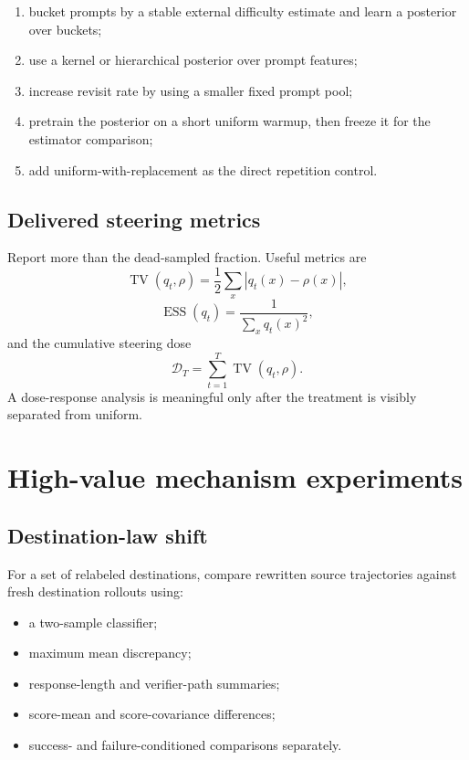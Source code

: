 \documentclass[11pt]{article}
\newcommand{\TV}{\operatorname{TV}}
\theoremstyle{definition}
\theoremstyle{remark}
\begin{document}
\begin{enumerate}[leftmargin=2em]
\item bucket prompts by a stable external difficulty estimate and learn a posterior over buckets;
\item use a kernel or hierarchical posterior over prompt features;
\item increase revisit rate by using a smaller fixed prompt pool;
\item pretrain the posterior on a short uniform warmup, then freeze it for the estimator comparison;
\item add uniform-with-replacement as the direct repetition control.
\end{enumerate}

\subsection{Delivered steering metrics}

Report more than the dead-sampled fraction. Useful metrics are
\begin{equation}
\TV(q_t,\rho)=\frac12\sum_x|q_t(x)-\rho(x)|,
\end{equation}
\begin{equation}
\operatorname{ESS}(q_t)=\frac{1}{\sum_x q_t(x)^2},
\end{equation}
and the cumulative steering dose
\begin{equation}
\mathcal D_T=\sum_{t=1}^{T}\TV(q_t,\rho).
\end{equation}
A dose-response analysis is meaningful only after the treatment is visibly separated from uniform.

\section{High-value mechanism experiments}

\subsection{Destination-law shift}

For a set of relabeled destinations, compare rewritten source trajectories against fresh destination rollouts using:

\begin{itemize}[leftmargin=2em]
\item a two-sample classifier;
\item maximum mean discrepancy;
\item response-length and verifier-path summaries;
\item score-mean and score-covariance differences;
\item success- and failure-conditioned comparisons separately.
\end{itemize}
\end{document}
